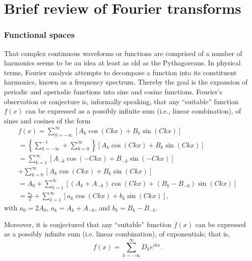 \chapter{Brief review of Fourier transforms}

\subsection{Functional spaces}

That complex continuous waveforms or functions are comprised
of a number of harmonics seems to be an idea at least as old as the Pythagoreans.
In physical terms, Fourier analysis\cite{koerner,Howell,herman-fa}
attempts to decompose a function into its constituent harmonics, known as a frequency spectrum.
Thereby the goal is the expansion of periodic and aperiodic functions into sine and cosine functions.
Fourier's observation or conjecture is, informally speaking, that any   ``suitable''
function $f(x)$
can be expressed as a  possibly infinite  sum (i.e., linear combination), of sines
and cosines of the form
\begin{equation}
\begin{split}
f(x)
=
\sum_{k=-\infty}^\infty
\left[ A_k \cos (C k x) + B_k \sin (C k x)\right]\\
=
\left\{
\sum_{k=-\infty}^{-1} + \sum_{k=0}^\infty
\right\}
\left[ A_k \cos (C k x) + B_k \sin (C k x)\right]\\
=
\sum_{k=1}^{\infty}
\left[ A_{-k} \cos (-C k x) + B_{-k} \sin (-C k x)\right]  \qquad \qquad \\
+
\sum_{k=0}^\infty
\left[ A_k \cos (C k x) + B_k \sin (C k x)\right]\\
=
 A_0 +
\sum_{k=1}^{\infty}
\left[ \left( A_k+A_{-k} \right) \cos (C k x) + \left( B_k-B_{-k} \right) \sin (C k x)\right]
\\
=  \frac{a_0}{2} +
\sum_{k=1}^\infty
\left[ a_k  \cos (C k x) + b_k  \sin (C k x)\right]
,
\label{2012-m-ch-fourier_conjecture}
\end{split}
\end{equation}
with   $a_0=2 A_0$,
$a_k = A_k+ A_{-k}$,
and
$b_k = B_k- B_{-k}$.

Moreover, it is conjectured that any ``suitable''
function $f(x)$
can be expressed as a  possibly infinite  sum (i.e. linear combination), of exponentials; that is,
\begin{equation}
f(x)= \sum_{k=-\infty}^\infty
D_k e^{ikx}.
\label{2012-m-ch-fourier_conjecture1}
\end{equation}


